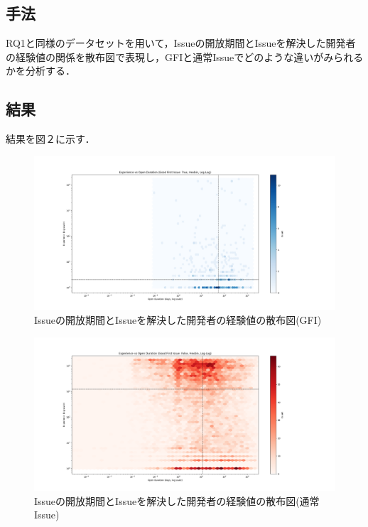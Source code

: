 \documentclass[twocolumn]{jarticle} %
\begin{document}
\subsection{手法}
RQ1と同様のデータセットを用いて，Issueの開放期間とIssueを解決した開発者の経験値の関係を散布図で表現し，GFIと通常Issueでどのような違いがみられるかを分析する．

\subsection{結果}
結果を図２に示す．

\begin{figure}[H]
\centerline{\includegraphics[width=0.9\linewidth]{@BSthesis2024_Nakai/BSthesis2024_Nakai_fig/fhex_blue.png}}
\caption{Issueの開放期間とIssueを解決した開発者の経験値の散布図(GFI)}
\label{fig:milestone}
\end{figure}

\begin{figure}[H]
\centerline{\includegraphics[width=0.9\linewidth]{@BSthesis2024_Nakai/BSthesis2024_Nakai_fig/fhex_red.png}}
\caption{Issueの開放期間とIssueを解決した開発者の経験値の散布図(通常Issue)}
\label{fig:milestone}
\end{figure}
\end{document}
